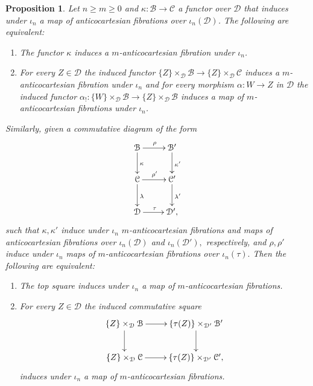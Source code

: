 \documentclass[10pt,oneside]{article}
\numberwithin{equation}{section} %
\numberwithin{figure}{section} %
\theoremstyle{plain}
\newtheorem{proposition}[theorem]{Proposition}
\theoremstyle{definition}
\newcommand{\mB}{{\mathcal B}}
\newcommand{\mC}{{\mathcal C}}
\newcommand{\mD}{{\mathcal D}}
\begin{document}
\begin{proposition} Let $ n  \geq m \geq 0$ and $\kappa: \mB \to \mC$ 
a functor over $\mD$ that induces under $\iota_n$ a map of anticocartesian fibrations over $\iota_n(\mD)$.
The following are equivalent:

\begin{enumerate}[\normalfont(1)]\setlength{\itemsep}{-2pt}
\item[(1)] The functor $\kappa$ induces a $m$-anticocartesian fibration under $\iota_n$.

\item[(2)] For every $Z \in \mD$ the induced functor 
$
\{Z\} \times_\mD \mB \to  \{Z\} \times_\mD \mC
$
induces a $m$-anticocartesian fibration under $\iota_n$ and for every morphism $\alpha:W \to Z$ in $\mD$ the induced functor
$\alpha_!:\{W\} \times_\mD \mB \to \{Z\} \times_\mD \mB$
induces a map of $m$-anticocartesian fibrations under $\iota_n$.
\end{enumerate}

Similarly, given a commutative diagram of the form 
\begin{equation}\label{sqco0}
\begin{xy}
\xymatrix{
\mB \ar[d]^\kappa \ar[r]^\rho
& \mB' \ar[d]^{\kappa'}
\\ 
\mC \ar[d]^{\lambda} \ar[r]^{\rho'} & \mC' \ar[d]^{\lambda'}
\\ 
\mD \ar[r]^\tau & \mD',
}
\end{xy}\end{equation}
such that $\kappa,\kappa'$ induce under $\iota_n$ $m$-anticocartesian fibrations and maps of anticocartesian fibrations over $\iota_n(\mD)$ and $\iota_n(\mD'),$ respectively, and $\rho,\rho'$
induce under $\iota_n$ maps of $m$-anticocartesian fibrations
over $\iota_n(\tau).$
Then the following are equivalent:

\begin{enumerate}[\normalfont(1)]\setlength{\itemsep}{-2pt}
\item[{(1')}] The top square induces under $\iota_n$ a map of $m$-anticocartesian fibrations.

\item[(2')] For every $Z \in \mD$ the induced commutative square
\begin{equation}\label{sqco1}
\begin{xy}
\xymatrix{
\{Z\} \times_\mD \mB \ar[d] \ar[r]
& \{\tau(Z)\} \times_{\mD'} \mB' \ar[d]
\\ 
\{Z\} \times_\mD \mC \ar[r] & \{\tau(Z)\} \times_{\mD'} \mC',
}
\end{xy}\end{equation}
induces under $\iota_n$ a map of $m$-anticocartesian fibrations.
\end{enumerate}
\end{proposition}
\end{document}
